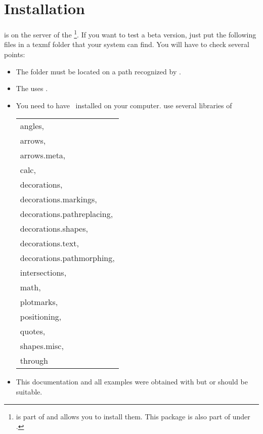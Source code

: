 \section{Installation}

\tkzname{\tkznameofpack} is on the server of the \footnote{\tkzname{\tkznameofpack} is part of  and  allows you to install them. This package is also part of  under .}. If you want to test a beta version, just put the following files in a texmf folder that your system can find.
You will have to check several points:

\begin{itemize}\setlength{\itemsep}{5pt}
\item  The \tkzname{\tkznameofpack} folder must be located on a path recognized by .
\item  The  \tkzname{\tkznameofpack} uses .

\item You need to have \PGF\ installed on your computer. \tkzname{\tkznameofpack} use several libraries of \TIKZ

 \begin{tabular}{l}
    angles,                         \\
    arrows,                         \\
    arrows.meta,                    \\
    calc,                           \\
    decorations,                    \\
    decorations.markings,           \\
    decorations.pathreplacing,      \\
    decorations.shapes,             \\
    decorations.text,               \\
    decorations.pathmorphing,       \\
    intersections,                  \\
    math,                           \\
    plotmarks,                      \\
    positioning,                    \\
    quotes,                         \\
    shapes.misc,                    \\
    through
\end{tabular}

\item This documentation and all examples were obtained with  but  or  should be suitable.
\end{itemize}

\endinput